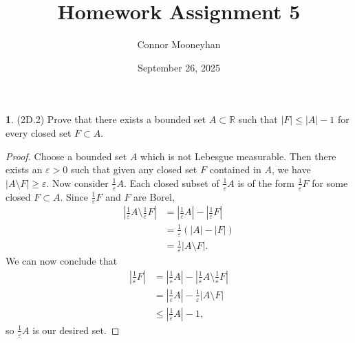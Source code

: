 \documentclass[12pt]{article}
\title{Homework Assignment 5}
\author{Connor Mooneyhan}
\date{September 26, 2025}
\theoremstyle{definition}
\newtheorem{ex}{}
\begin{document}
\maketitle

\begin{ex}
	(2D.2)
	Prove that there exists a bounded set $A \subset \mathbb{R}$ such that $|F| \leq |A| - 1$ for every closed set $F \subset A$.
\end{ex}
\begin{proof}
	Choose a bounded set $A$ which is not Lebesgue measurable.
	Then there exists an $\varepsilon > 0$ such that given any closed set $F$ contained in $A$, we have $|A \setminus F| \geq \varepsilon$.
	Now consider $\frac{1}{\varepsilon}A$.
	Each closed subset of $\frac{1}{\varepsilon}A$ is of the form $\frac{1}{\varepsilon}F$ for some closed $F \subset A$.
	Since $\frac{1}{\varepsilon}F$ and $F$ are Borel, \begin{align*}
		\left| \frac{1}{\varepsilon}A \setminus \frac{1}{\varepsilon}F \right| & = \left|\frac{1}{\varepsilon}A\right| - \left|\frac{1}{\varepsilon}F\right| \\
		                                                                       & = \frac{1}{\varepsilon} \left( |A| - |F| \right)                            \\
		                                                                       & = \frac{1}{\varepsilon} |A \setminus F|.
	\end{align*}
	We can now conclude that \begin{align*}
		\left|\frac{1}{\varepsilon}F\right| & = \left| \frac{1}{\varepsilon}A \right| - \left|\frac{1}{\varepsilon}A \setminus \frac{1}{\varepsilon}F \right| \\
		                                    & = \left| \frac{1}{\varepsilon}A \right| - \frac{1}{\varepsilon}\left|A \setminus F \right|                      \\
		                                    & \leq \left| \frac{1}{\varepsilon}A \right| - 1,
	\end{align*}
	so $\frac{1}{\varepsilon}A$ is our desired set.
\end{proof}
\end{document}
